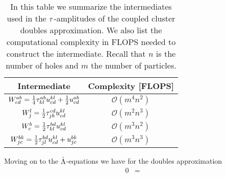         \begin{table}
            \centering
            \caption{In this table we summarize the intermediates used in
            the $\tau$-amplitudes of the coupled cluster doubles approximation. We
            also list the computational complexity in FLOPS needed to construct
            the intermediate. Recall that $n$ is the number of holes and $m$ the
            number of particles.}
            \begin{tabular}{cc}
                Intermediate & Complexity [FLOPS] \\
                \midrule
                $W^{ab}_{cd}
                = \frac{1}{4} \tau^{ab}_{kl} u^{kl}_{cd}
                + \frac{1}{2} u^{ab}_{cd}$
                &
                $\mathcal{O}(m^4 n^2)$ \\
                \addlinespace
                $W^{l}_{j}
                = \frac{1}{2} \tau^{cd}_{jk} u^{kl}_{cd}$
                &
                $\mathcal{O}(m^2 n^3)$
                \\
                \addlinespace
                $W^{b}_{c}
                = \frac{1}{2} \tau^{bd}_{kl} u^{kl}_{cd}$
                &
                $\mathcal{O}(m^3 n^2)$
                \\
                \addlinespace
                $W^{bk}_{jc}
                = \frac{1}{2} \tau^{bd}_{jl} u^{kl}_{cd}
                + u^{bk}_{jc}$
                &
                $\mathcal{O}(m^3n^3)$
            \end{tabular}
            \label{tab:intermediates_ccd}
        \end{table}
        Moving on to the $\hat{\Lambda}$-equations we have for the doubles
        approximation
        \begin{align}
            0 &=
        \end{align}

